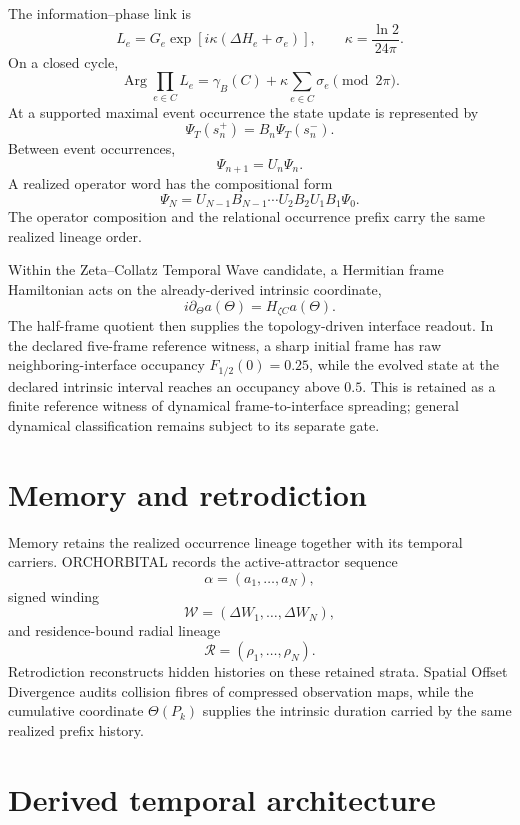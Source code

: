 \documentclass[11pt]{book}
\begin{document}
The information--phase link is
\[
L_e
=G_e\exp\!\left[i\kappa(\Delta H_e+\sigma_e)\right],
\qquad
\boxed{\kappa=\frac{\ln2}{24\pi}}.
\]
On a closed cycle,
\[
\boxed{
\operatorname{Arg}\prod_{e\in C}L_e
=\gamma_B(C)+\kappa\sum_{e\in C}\sigma_e
\pmod{2\pi}.
}
\]
At a supported maximal event occurrence the state update is represented by
\[
\boxed{
\Psi_T(s_n^+)=B_n\Psi_T(s_n^-).
}
\]
Between event occurrences,
\[
\boxed{\Psi_{n+1}=U_n\Psi_n.}
\]
A realized operator word has the compositional form
\[
\boxed{
\Psi_N
=U_{N-1}B_{N-1}\cdots U_2B_2U_1B_1\Psi_0.
}
\]
The operator composition and the relational occurrence prefix carry the same realized lineage order.

Within the Zeta--Collatz Temporal Wave candidate, a Hermitian frame Hamiltonian acts on the already-derived intrinsic coordinate,
\[
\boxed{
i\partial_\Theta a(\Theta)=H_{\zeta C}a(\Theta).
}
\]
The half-frame quotient then supplies the topology-driven interface readout. In the declared five-frame reference witness, a sharp initial frame has raw neighboring-interface occupancy $F_{1/2}(0)=0.25$, while the evolved state at the declared intrinsic interval reaches an occupancy above $0.5$. This is retained as a finite reference witness of dynamical frame-to-interface spreading; general dynamical classification remains subject to its separate gate.

\section{Memory and retrodiction}

Memory retains the realized occurrence lineage together with its temporal carriers. ORCHORBITAL records the active-attractor sequence
\[
\alpha=(a_1,\ldots,a_N),
\]
signed winding
\[
\mathcal W=(\Delta W_1,\ldots,\Delta W_N),
\]
and residence-bound radial lineage
\[
\mathcal R=(\rho_1,\ldots,\rho_N).
\]
Retrodiction reconstructs hidden histories on these retained strata. Spatial Offset Divergence audits collision fibres of compressed observation maps, while the cumulative coordinate $\Theta(P_k)$ supplies the intrinsic duration carried by the same realized prefix history.

\section{Derived temporal architecture}
\end{document}
